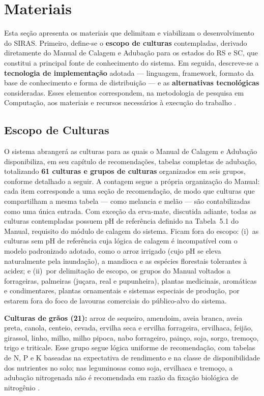\section{Materiais}\label{sec:materiais}

Esta seção apresenta os materiais que delimitam e viabilizam o
desenvolvimento do SIRAS. Primeiro, define-se o \textbf{escopo de
culturas} contempladas, derivado diretamente do Manual de Calagem e
Adubação para os estados do RS e SC, que constitui a principal fonte de
conhecimento do sistema. Em seguida, descreve-se a \textbf{tecnologia de
implementação} adotada --- linguagem, framework, formato da base de
conhecimento e forma de distribuição --- e as \textbf{alternativas
tecnológicas} consideradas. Esses elementos correspondem, na metodologia
de pesquisa em Computação, aos materiais e recursos necessários à
execução do trabalho \citep{Wazlawick2014}.

\subsection{Escopo de Culturas}\label{sec:escopo}

O sistema abrangerá as culturas para as quais o Manual de Calagem e
Adubação \citep{ManualCalagem2016} disponibiliza, em seu capítulo de
recomendações, tabelas completas de adubação, totalizando
\textbf{61 culturas e grupos de culturas} organizados em seis grupos,
conforme detalhado a seguir. A contagem segue a própria organização do
Manual: cada item corresponde a uma seção de recomendação, de modo que
culturas que compartilham a mesma tabela --- como melancia e melão ---
são contabilizadas como uma única entrada. Com exceção da erva-mate,
discutida adiante, todas as culturas contempladas possuem pH de
referência definido na Tabela~5.1 do Manual, requisito do módulo de
calagem do sistema. Ficam fora do escopo: (i)~as culturas sem pH de
referência cuja lógica de calagem é incompatível com o modelo
padronizado adotado, como o arroz irrigado (cujo pH se eleva
naturalmente pela inundação), a mandioca e as espécies florestais
tolerantes à acidez; e (ii)~por delimitação de escopo, os grupos do
Manual voltados a forrageiras, palmeiras (juçara, real e pupunheira),
plantas medicinais, aromáticas e condimentares, plantas ornamentais e
sistemas especiais de produção, por estarem fora do foco de lavouras
comerciais do público-alvo do sistema.

\textbf{Culturas de grãos (21):} arroz de sequeiro, amendoim, aveia branca,
aveia preta, canola, centeio, cevada, ervilha seca e ervilha forrageira,
ervilhaca, feijão, girassol, linho, milho, milho pipoca, nabo forrageiro,
painço, soja, sorgo, tremoço, trigo e triticale. Esse grupo segue lógica
uniforme de recomendação, com tabelas de N, P e K baseadas na expectativa
de rendimento e na classe de disponibilidade dos nutrientes no solo; nas
leguminosas como soja, ervilhaca e tremoço, a adubação nitrogenada não é
recomendada em razão da fixação biológica de nitrogênio
\citep{ManualCalagem2016}.

